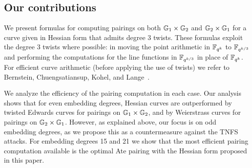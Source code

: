 




\subsection{Our contributions}

We present formulas for computing pairings on both $\mathbb{G}_{1} \times \mathbb{G}_{2}$ and $\mathbb{G}_{2} \times \mathbb{G}_{1}$ for a curve given in Hessian form that admits degree 3 twists.
These formulas exploit the degree 3 twists where possible: in moving the point arithmetic in $\mathbb{F}_{q^k}$ to $\mathbb{F}_{q^{k/3}}$ and performing the computations for the line functions in $\mathbb{F}_{q^{k/3}}$ in place of $\mathbb{F}_{q^k}$.
For efficient curve arithmetic (before applying the use of twists) we refer to
Bernstein, Chuengsatiansup, Kohel, and Lange~\cite{2015/hessian}.

We analyze the efficiency of the pairing computation in each case. 
Our analysis shows that for even embedding degrees, Hessian curves are outperformed by twisted Edwards curves for pairings on $\mathbb{G}_{1} \times \mathbb{G}_{2}$, and by Weierstrass curves for pairings on $\mathbb{G}_{2} \times \mathbb{G}_{1}$.
However, as explained above, our focus is on odd embedding degrees, as we propose 
this as a countermeasure against the TNFS attacks.
For embedding degrees 15 and 21 we show that the most efficient pairing
computation available is the optimal Ate pairing with the Hessian form proposed in this paper.

